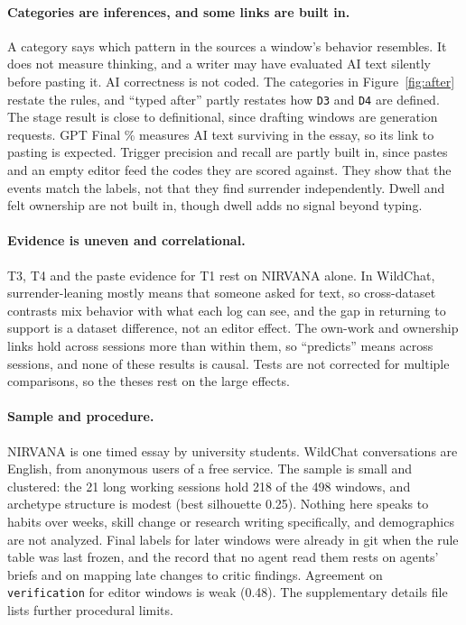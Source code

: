 \documentclass[manuscript,screen]{acmart}
\newcommand{\code}[1]{\texttt{#1}}
\begin{document}
\paragraph{Categories are inferences, and some links are built in.} A category says which pattern in the sources a window's behavior resembles. It does not measure thinking, and a writer may have evaluated AI text silently before pasting it. AI correctness is not coded. The categories in Figure~\ref{fig:after} restate the rules, and ``typed after'' partly restates how \code{D3} and \code{D4} are defined. The stage result is close to definitional, since drafting windows are generation requests. GPT Final \% measures AI text surviving in the essay, so its link to pasting is expected. Trigger precision and recall are partly built in, since pastes and an empty editor feed the codes they are scored against. They show that the events match the labels, not that they find surrender independently. Dwell and felt ownership are not built in, though dwell adds no signal beyond typing.

\paragraph{Evidence is uneven and correlational.} T3, T4 and the paste evidence for T1 rest on NIRVANA alone. In WildChat, surrender-leaning mostly means that someone asked for text, so cross-dataset contrasts mix behavior with what each log can see, and the gap in returning to support is a dataset difference, not an editor effect. The own-work and ownership links hold across sessions more than within them, so ``predicts'' means across sessions, and none of these results is causal. Tests are not corrected for multiple comparisons, so the theses rest on the large effects.

\paragraph{Sample and procedure.} NIRVANA is one timed essay by university students. WildChat conversations are English, from anonymous users of a free service. The sample is small and clustered: the 21 long working sessions hold 218 of the 498 windows, and archetype structure is modest (best silhouette 0.25). Nothing here speaks to habits over weeks, skill change or research writing specifically, and demographics are not analyzed. Final labels for later windows were already in git when the rule table was last frozen, and the record that no agent read them rests on agents' briefs and on mapping late changes to critic findings. Agreement on \code{verification} for editor windows is weak (0.48). The supplementary details file lists further procedural limits.
\end{document}

